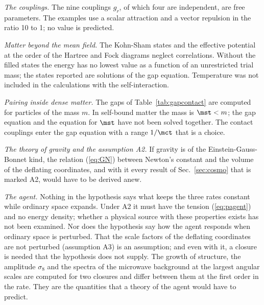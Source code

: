 \emph{The couplings.} The nine couplings $g_r$, of which four are independent, are free parameters.
The examples use a scalar attraction and a vector repulsion in the ratio 10 to 1; no value is
predicted.

\emph{Matter beyond the mean field.} The Kohn-Sham states and the effective potential at the order
of the Hartree and Fock diagrams neglect correlations. Without the filled states the energy has no
lowest value as a function of an unrestricted trial mass; the states reported are solutions of the
gap equation. Temperature was not included in the calculations with the self-interaction.

\emph{Pairing inside dense matter.} The gaps of Table~\ref{tab:gapcontact} are computed for
particles of the mass $m$. In self-bound matter the mass is $\mst<m$; the gap equation and the
equation for $\mst$ have not been solved together. The contact couplings enter the gap equation with
a range $1/\mct$ that is a choice.

\emph{The theory of gravity and the assumption A2.} If gravity is of the Einstein-Gauss-Bonnet kind,
the relation (\ref{eq:GN}) between Newton's constant and the volume of the deflating coordinates,
and with it every result of Sec.~\ref{sec:cosmo} that is marked A2, would have to be derived anew.

\emph{The agent.} Nothing in the hypothesis says what keeps the three rates constant while ordinary
space expands. Under A2 it must have the tension (\ref{eq:pagent}) and no energy density; whether a
physical source with these properties exists has not been examined. Nor does the hypothesis say how
the agent responds when ordinary space is perturbed. That the scale factors of the deflating
coordinates are not perturbed (assumption A3) is an assumption; and even with it, a closure is
needed that the hypothesis does not supply. The growth of structure, the amplitude $\sigma_8$ and
the spectra of the microwave background at the largest angular scales are computed for two closures
and differ between them at the first order in the rate. They are the quantities that a theory of
the agent would have to predict.

